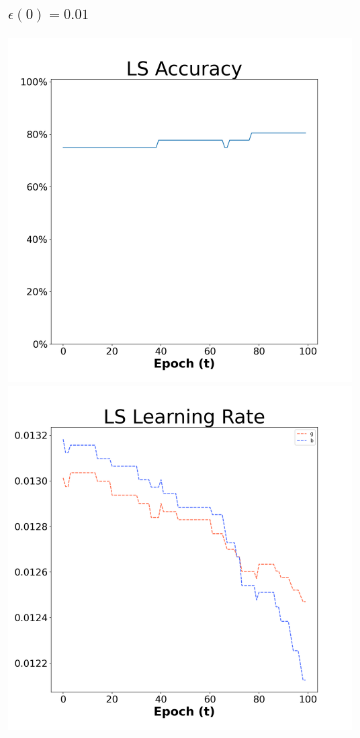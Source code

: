 \begin{figure}[H]
\begin{subfigure}{0.3\textwidth}
  \caption{$\epsilon(0)=0.01$}
\end{subfigure}\hfil %
\begin{subfigure}{0.3\textwidth}
  \includegraphics[width=\linewidth]{images/exper1/Ionosphere/LS_0.03_acc.png}
  \includegraphics[width=\linewidth]{images/exper1/Ionosphere/LS_0.03_lr.png}

\end{subfigure}
\end{figure}
